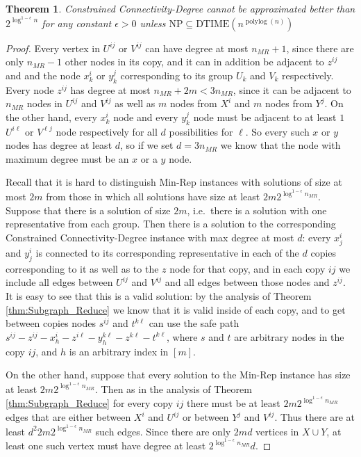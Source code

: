 \documentclass[11pt,letterpaper]{article}
\newtheorem{theorem}{Theorem}[section]
\theoremstyle{definition}
\def\polylog{\operatorname{polylog}}
\begin{document}
\begin{theorem} \label{thm:ccdeghard}
{\sc Constrained Connectivity-Degree} cannot be approximated better than $2^{\log^{1-\epsilon} n}$ for any constant $\epsilon > 0$ unless $\text{NP} \subseteq \text{DTIME}(n^{\polylog(n)})$
\end{theorem}
\begin{proof}
Every vertex in $U^{ij}$ or $V^{ij}$ can have degree at most $n_{MR} + 1$, since there are only $n_{MR}-1$ other nodes in its copy, and it can in addition be adjacent to $z^{ij}$ and and the node $x^i_k$ or $y^j_k$ corresponding to its group $U_k$ and $V_k$ respectively.  Every node $z^{ij}$ has degree at most $n_{MR} + 2m < 3n_{MR}$, since it can be adjacent to $n_{MR}$ nodes in $U^{ij}$ and $V^{ij}$ as well as $m$ nodes from $X^i$ and $m$ nodes from $Y^j$.  On the other hand, every $x^i_k$ node and every $y^j_k$ node must be adjacent to at least $1$ $U^{i\ell}$ or $V^{\ell j}$ node respectively for all $d$ possibilities for $\ell$.  So every such $x$ or $y$ nodes has degree at least $d$, so if we set $d = 3n_{MR}$ we know that the node with maximum degree must be an $x$ or a $y$ node.

Recall that it is hard to distinguish {\sc Min-Rep} instances with solutions of size at most $2m$ from those in which all solutions have size at least $2m 2^{\log^{1-\epsilon} n_{MR}}$.  Suppose that there is a solution of size $2m$, i.e.\ there is a solution with one representative from each group.  Then there is a solution to the corresponding {\sc Constrained Connectivity-Degree} instance with max degree at most $d$: every $x^i_j$ and $y^i_j$ is connected to its corresponding representative in each of the $d$ copies corresponding to it as well as to the $z$ node for that copy, and in each copy $ij$ we include all edges between $U^{ij}$ and $V^{ij}$ and all edges between those nodes and $z^{ij}$.  It is easy to see that this is a valid solution: by the analysis of Theorem \ref{thm:Subgraph_Reduce} we know that it is valid inside of each copy, and to get between copies nodes $s^{ij}$ and $t^{k\ell}$ can use the safe path $s^{ij} - z^{ij} - x^i_h - z^{i\ell} - y^{k\ell}_h - z^{k\ell} - t^{k\ell}$, where $s$ and $t$ are arbitrary nodes in the copy $ij$, and $h$ is an arbitrary index in $[m]$.

On the other hand, suppose that every solution to the {\sc Min-Rep} instance has size at least $2m2^{\log^{1-\epsilon} n_{MR}}$.  Then as in the analysis of Theorem \ref{thm:Subgraph_Reduce} for every copy $ij$ there must be at least $2m2^{\log^{1-\epsilon} n_{MR}}$ edges that are either between $X^i$ and $U^{ij}$ or between $Y^j$ and $V^{ij}$.  Thus there are at least $d^2 2m2^{\log^{1-\epsilon} n_{MR}}$ such edges.  Since there are only $2md$ vertices in $X \cup Y$, at least one such vertex must have degree at least $2^{\log^{1-\epsilon} n_{MR}} d$.


\end{proof}
\end{document}

